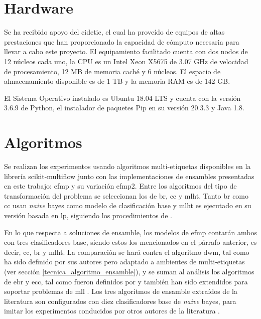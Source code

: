 \section{Hardware}

Se ha recibido apoyo del \acrfull{cidetic}, el cual ha proveído de equipos de
altas prestaciones que han proporcionado la capacidad de cómputo necesaria para
llevar a cabo este proyecto. El equipamiento facilitado cuenta con dos nodos de
12 núcleos cada uno, la CPU es un Intel Xeon X5675 de 3.07 GHz de velocidad de
procesamiento, 12 MB de memoria caché y 6 núcleos. El espacio de almacenamiento
disponible es de 1 TB y la memoria RAM es de 142 GB. 

El Sistema Operativo instalado es Ubuntu 18.04 LTS y cuenta con la versión 3.6.9
de Python, el instalador de paquetes Pip en su versión 20.3.3 y Java 1.8.

\section{Algoritmos}
\label{experimentos_algoritmos}

Se realizan los experimentos usando algoritmos multi-etiquetas disponibles en la
librería scikit-multiflow junto con las implementaciones de ensambles
presentadas en este trabajo: \acrfull{efmp} y su variación \acrshort{efmp2}.
Entre los algoritmos del tipo de transformación del problema se seleccionan los
de \acrfull{br}, \acrfull{cc} y \acrfull{mlht}. Tanto \acrshort{br} como
\acrshort{cc} usan \textit{naive} bayes como modelo de clasificación base y
\acrshort{mlht} es ejecutado en su versión basada en \acrfull{lp}, siguiendo los
procedimientos de \citeauthor{read_scalable_2012} \cite{read_scalable_2012}.

En lo que respecta a soluciones de ensamble, los modelos de \acrshort{efmp}
contarán ambos con tres clasificadores base, siendo estos los mencionados en el
párrafo anterior, es decir, \acrshort{cc}, \acrshort{br} y \acrshort{mlht}. La
comparación se hará contra el algoritmo \acrfull{dwm}, tal como ha sido definido
por sus autores \cite{kolter_dynamic_2007} pero adaptado a ambientes de
multi-etiquetas (ver sección \ref{tecnica_algoritmo_ensamble}), y se suman al
análisis los algoritmos de \acrfull{ebr} y \acrfull{ecc}, tal como fueron
definidos por \citeauthor{oza_online_2005} \cite{oza_online_2005} y también han
sido extendidos para soportar problemas de \acrshort{mll}
\cite{read_classifier_2011}. Los tres algoritmos de ensamble extraídos de la
literatura son configurados con diez clasificadores base de \textit{naive}
bayes, para imitar los experimentos conducidos por otros autores de la
literatura \cite{osojnik_multi-label_2017, read_scalable_2012,
	buyukcakir_novel_2018}.

